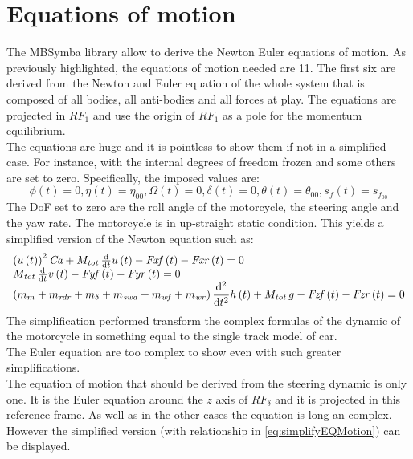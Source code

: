 \section{Equations of motion}
%
The MBSymba library\cite{multibod60:online} allow to derive the Newton Euler equations of motion. As previously highlighted, the equations of motion needed are 11.
The first six are derived from the Newton and Euler equation of the whole system that is composed of all bodies, all anti-bodies and all forces at play. The equations are projected in $RF_1$ and use the origin of $RF_1$ as a pole for the momentum equilibrium.\\ 
The equations are huge and it is pointless to show them if not in a simplified case. For instance, with the internal degrees of freedom frozen and some others are set to zero. Specifically, the imposed values are:
%
\begin{equation}
    \label{eq:simplifyEQMotion}
    \phi(t) = 0, \eta(t)=\eta_00, \Omega(t) = 0, \delta(t) = 0, \theta(t) = \theta_00, s_f(t)=s_{f_{00}}
\end{equation}
%
The DoF set to zero are the roll angle of the motorcycle, the steering angle and the yaw rate. The motorcycle is in up-straight static condition. 
This yields a simplified version of the Newton equation such as:
%
\begin{equation}
\begin{array}{l}
\left( u \left( t \right)  \right) ^{2}{\it Ca}+M_{{\it tot}}\,{\frac {\rm d}{{\rm d}t}}u \left( t \right) -{\it Fxf} \left( t \right) -{\it Fxr} \left( t \right) = 0 \\
M_{{\it tot}}\,{\frac {\rm d}{{\rm d}t}}v \left( t \right) -{\it Fyf} \left( t \right) -{\it Fyr} \left( t \right) = 0\\
\displaystyle \left( m_{m}+m_{{\it rdr}}+m_{\delta}+m_{{\it swa}}+m_{{\it wf}}+m_{{\it wr}} \right) {\frac {{\rm d}^{2}}{{\rm d}{t}^{2}}}h \left( t \right) +M_{{\it tot}}\,g-{\it Fzf} \left( t \right) -{\it Fzr} \left( t \right) = 0
\end{array}
\end{equation}
%
The simplification performed transform the complex formulas of the dynamic of the motorcycle in something equal to the single track model of car.\\
The Euler equation are too complex to show even with such greater simplifications.\\
The equation of motion that should be derived from the steering dynamic is only one. It is the Euler equation around the $z$ axis of $RF_\delta$ and it is projected in this reference frame. As well as in the other cases the equation is long an complex. However the simplified version (with relationship in \ref{eq:simplifyEQMotion}) can be displayed.
